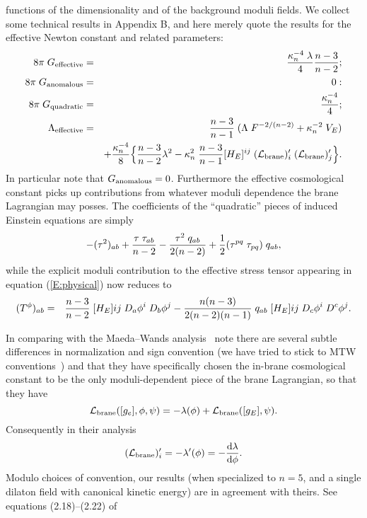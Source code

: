 \documentclass[a4paper,10pt]{article}
\begin{document}
{functions of the dimensionality and of the background moduli fields.
We collect some technical results in Appendix B, and here merely quote
the results for the effective Newton constant and related parameters:
%
\begin{eqnarray}
8\pi\;G_{\mathrm{effective}} &=&  
{\kappa_n^{-4}\; \lambda\over4} {n-3\over n-2};
\\
8\pi\;G_{\mathrm{anomalous}} &=&  0:
\\
8\pi\;G_{\mathrm{quadratic}} &=& 
{\kappa_n^{-4}\over4}; 
\\
\Lambda_{\mathrm{effective}} &=&
{n-3 \over n-1} \;(\Lambda \; F^{-2/(n-2)} + \kappa_n^{-2} \; V_E)
\nonumber\\
&&
+ {\kappa_n^{-4}\over8} 
\Big\{ 
{n-3\over n-2} \lambda^2 
-\kappa_n^2 \; {n-3\over n-1} [H_E]^{ij}  \;({\mathcal L}_{\mathrm{brane}})'_i   \;({\mathcal L}_{\mathrm{brane}})'_j
\Big\}.
\end{eqnarray}
%
In particular note that $G_{\mathrm{anomalous}}=0$.  Furthermore the effective
cosmological constant picks up contributions from whatever moduli
dependence the brane Lagrangian may posses.  The coefficients of the
``quadratic'' pieces of induced Einstein equations are simply
%
\begin{equation}
- (\tau^2)_{ab} 
+ {\tau \; \tau_{ab}\over n-2} 
- {\tau^2 \; q_{ab}\over2(n-2)}
+ {1\over2} (\tau^{pq} \; \tau_{pq}) \; q_{ab},
\end{equation}
%
while the explicit moduli contribution to the effective stress
tensor appearing in equation (\ref{E:physical}) now reduces to
%
\begin{eqnarray}
(T^\phi) _{ab} &=& 
{n-3 \over n-2} \; 
[H_E]{ij}\; D_a \phi^i \; D_b \phi^j 
- 
{n(n-3) \over2 (n-2)(n-1)} \; q_{ab} \; [H_E]{ij} \; 
D_c \phi^i \; D^c \phi^j. 
\label{E:t-moduli-einstein} 
\end{eqnarray}

In comparing with the Maeda--Wands analysis~\cite{Wands} note there
are several subtle differences in normalization and sign convention
(we have tried to stick to MTW conventions~\cite{MTW}) and that they
have specifically chosen the in-brane cosmological constant to be the
only moduli-dependent piece of the brane Lagrangian, so that they have
%
\begin{equation}
{\mathcal L}_{\mathrm{brane}}([g_e],\phi,\psi) = - \lambda(\phi) + {\mathcal L}_{\mathrm{brane}}([g_E],\psi).
\end{equation}
%
Consequently in their analysis 
%
\begin{equation}
({\mathcal L}_{\mathrm{brane}})'_i  = - \lambda'(\phi) = - {{\mathrm d}\lambda\over{\mathrm d}\phi}.
\end{equation}
%
Modulo choices of convention, our results (when specialized to $n=5$,
and a single dilaton field with canonical kinetic energy) are in
agreement with theirs. See equations (2.18)--(2.22) of~\cite{Wands}

}
\end{document}
